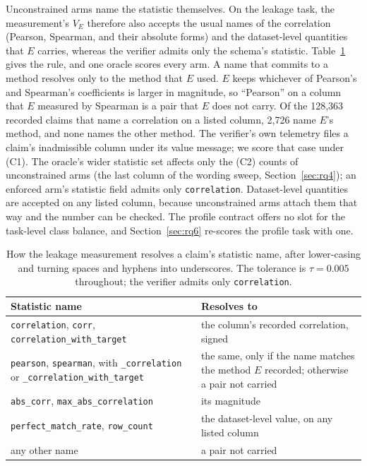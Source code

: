 \documentclass[10pt,twocolumn]{article}
\begin{document}
Unconstrained arms name the statistic themselves. On the leakage task, the
measurement's $V_E$ therefore also accepts the usual names of the correlation
(Pearson, Spearman, and their absolute forms) and the dataset-level quantities
that $E$ carries, whereas the verifier admits only the schema's statistic.
Table~\ref{tab:alias} gives the rule, and one oracle scores every arm. A name
that commits to a method resolves only to the method that $E$ used. $E$ keeps
whichever of Pearson's and Spearman's coefficients is larger in magnitude, so
``Pearson'' on a column that $E$ measured by Spearman is a pair that $E$ does
not carry. Of the 128{,}363 recorded claims that name a correlation on a listed
column, 2{,}726 name $E$'s method, and none names the other method. The
verifier's own telemetry files a claim's inadmissible column under its value
message; we score that case under (C1). The oracle's wider statistic set
affects only the (C2) counts of unconstrained arms (the last column of the
wording sweep, Section~\ref{sec:rq4}); an enforced arm's statistic field admits
only \texttt{correlation}. Dataset-level quantities are accepted on any listed
column, because unconstrained arms attach them that way and the number can be
checked. The profile contract offers no slot for the task-level class balance,
and Section~\ref{sec:rq6} re-scores the profile task with one.

\begin{table}[!htbp]
\caption{How the leakage measurement resolves a claim's statistic name, after
lower-casing and turning spaces and hyphens into underscores. The tolerance is
$\tau=0.005$ throughout; the verifier admits only \texttt{correlation}.}
\label{tab:alias}
\centering
\footnotesize
\setlength{\tabcolsep}{3pt}
\begin{tabular}{@{}p{3.9cm}p{4.4cm}@{}}
\toprule
Statistic name & Resolves to \\
\midrule
\texttt{correlation}, \texttt{corr}, \texttt{correlation\_with\_target} & the column's recorded correlation, signed \\
\texttt{pearson}, \texttt{spearman}, with \texttt{\_correlation} or \texttt{\_correlation\_with\_target} & the same, only if the name matches the method $E$ recorded; otherwise a pair not carried \\
\texttt{abs\_corr}, \texttt{max\_abs\_correlation} & its magnitude \\
\texttt{perfect\_match\_rate}, \texttt{row\_count} & the dataset-level value, on any listed column \\
any other name & a pair not carried \\
\bottomrule
\end{tabular}
\end{table}
\end{document}
